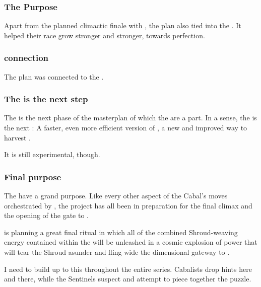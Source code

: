 \subsubsection{The \Resphan{} Purpose}
Apart from the planned climactic finale with , the \iquin{} plan also tied into the . 
It helped their race grow stronger and stronger, towards perfection. 





\subsubsection{\Noggyal connection}
The \iquin plan was connected to the .





\subsubsection{The \Morbus is the next step}
The  is the next phase of the masterplan of which the \sephiroth{} are a part. 
In a sense, the \Morbus{} is the next : 
A faster, even more efficient version of \iquin, a new and improved way to harvest \humans{}. 

It is still experimental, though. 





\subsubsection{Final purpose}
The {\Sephiroth} have a grand purpose. Like every other aspect of the Cabal's moves orchestrated by , the \sephirah{} project has all been in preparation for the final climax and the opening of the gate to . 

\Daggerrain{} is planning a great final ritual in which all of the combined Shroud-weaving energy contained within the \Sephiroth{} will be unleashed in a cosmic explosion of \vertex{} power that will tear the Shroud asunder and fling wide the dimensional gateway to \Erebos.

I need to build up to this throughout the entire series. Cabalists drop hints here and there, while the Sentinels suspect and attempt to piece together the puzzle.

